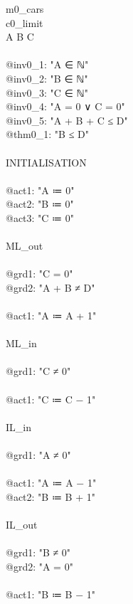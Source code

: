 \begin{description}
	\begin{center}
		\begin{Bcode}
			\ifplastex
			\Bmachine{} m0_cars\\
			\Bsees{} c0_limit\\
			\Bvariables{} A B C\\
			\Binvariants\\
			@inv0_1: "A ∈ ℕ"\\
			@inv0_2: "B ∈ ℕ"\\
			@inv0_3: "C ∈ ℕ"\\
			@inv0_4: "A = 0 ∨ C = 0"\\
			@inv0_5: "A + B + C ≤ D"\\
			@thm0_1: "B ≤ D" \Btheorem\\
			\Bevents\\
			INITIALISATION\\
			\Bbegin\\
			@act1: "A ≔ 0"\\
			@act2: "B ≔ 0"\\
			@act3: "C ≔ 0"\\
			\Bend\\
			ML_out\\
			\Bwhen\\
			@grd1: "C = 0"\\
			@grd2: "A + B ≠ D"\\
			\Bthen\\
			@act1: "A ≔ A + 1"\\
			\Bend\\
			ML_in\\
			\Bwhen\\
			@grd1: "C ≠ 0"\\
			\Bthen\\
			@act1: "C ≔ C − 1"\\
			\Bend\\
			IL_in\\
			\Bwhen\\
			@grd1: "A ≠ 0"\\
			\Bthen\\
			@act1: "A ≔ A − 1"\\
			@act2: "B ≔ B + 1"\\
			\Bend\\
			IL_out\\
			\Bwhen\\
			@grd1: "B ≠ 0"\\
			@grd2: "A = 0"\\
			\Bthen\\
			@act1: "B ≔ B − 1"\\

\end{Bcode}
\end{center}
\end{description}

